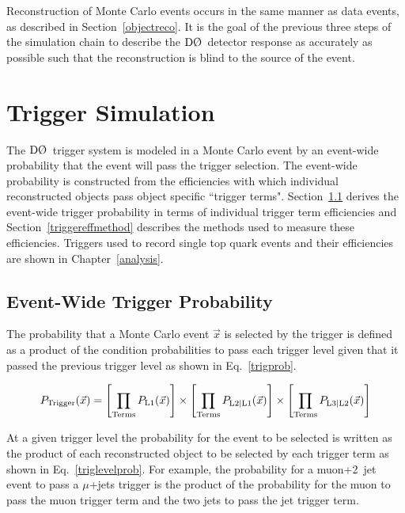 Reconstruction of Monte Carlo events occurs in the same manner as data events, as described in Section~\ref{objectreco}. It is the goal of the previous three steps of the simulation chain to describe the $\dzero$~detector response as accurately as possible such that the reconstruction is blind to the source of the event.

\section{Trigger Simulation}
\label{triggersim}

The $\dzero$~trigger system is modeled in a Monte Carlo event by an event-wide probability that the event will pass the trigger selection. The event-wide probability is constructed from the efficiencies with which individual reconstructed objects pass object specific ``trigger terms". Section~\ref{triggerprob} derives the event-wide trigger probability in terms of individual trigger term efficiencies and Section~\ref{triggereffmethod} describes the methods used to measure these efficiencies. Triggers used to record single top quark events and their efficiencies are shown in Chapter~\ref{analysis}.

\subsection{Event-Wide Trigger Probability}
\label{triggerprob}

The probability that a Monte Carlo event $\vec{x}$ is selected by the trigger is defined as a product of the condition probabilities to pass each trigger level given that it passed the previous trigger level as shown in Eq.~\ref{trigprob}.

\begin{equation}
\label{trigprob}
P_{\rm{Trigger}}(\vec{x}) = \left[ \prod_{\rm{Terms}}P_{\rm{L1}}(\vec{x}) \right ] \times \left[ \prod_{\rm{Terms}}P_{\rm{L2|L1}}(\vec{x}) \right ] \times \left[ \prod_{\rm{Terms}}P_{\rm{L3|L2}}(\vec{x}) \right ]
\end{equation}

At a given trigger level the probability for the event to be selected is written as the product of each reconstructed object to be selected by each trigger term as shown in Eq.~\ref{triglevelprob}. For example, the probability for a muon+2~jet event to pass a $\mu$+jets trigger is the product of the probability for the muon to pass the muon trigger term and the two jets to pass the jet trigger term.

